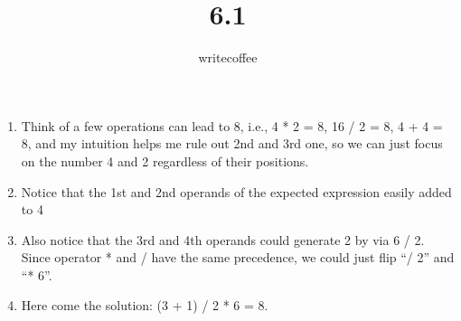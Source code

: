 \documentclass[11pt,twoside,onecolumn,a4paper,notitlepage]{article}
\begin{document}
\author{writecoffee}
\title{6.1}
\maketitle

{\setlength{\baselineskip}{1\baselineskip}
\setlength{\parindent}{0pt}
\setlength{\parskip}{2ex plus 0.5ex minus 0.2ex}
\begin{enumerate}[1.]
\item
	Think of a few operations can lead to 8, i.e., 4 * 2 = 8, 16 / 2 = 8, 4 + 4 = 8, %
	and my intuition helps me rule out 2nd and 3rd one, so we can just %
	focus on the number 4 and 2 regardless of their positions.
\item
	Notice that the 1st and 2nd operands of the expected expression easily added to 4
\item
 	Also notice that the 3rd and 4th operands could generate 2 by via 6 / 2. Since %
	operator * and / have the same precedence, we could just flip ``/ 2'' and ``* 6''.
\item
	Here come the solution: (3 + 1) / 2 * 6 = 8.
\end{enumerate}
\par}
\end{document}

